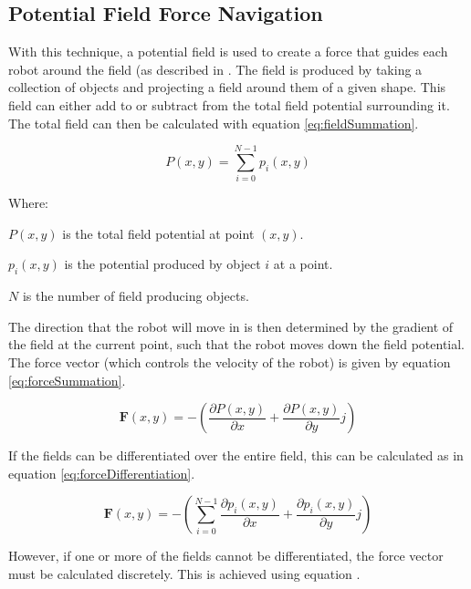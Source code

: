 \documentclass[10pt]{article}
\begin{document}
\subsection{Potential Field Force Navigation\label{sub:Potential-Field-Force}}

With this technique, a potential field is used to create a force that guides each robot around the field (as described in \cite{intelligentAlgorithmPathPlanning}. The field is produced by taking a collection of objects and projecting a field around them of a given shape. This field can either add to or subtract from the total field potential surrounding it. The total field can then be calculated with equation \ref{eq:fieldSummation}.

\begin{equation}
P(x,y)=\sum_{i=0}^{N-1}p_{i}\left(x,y\right)\label{eq:fieldSummation}
\end{equation}

Where:

$P\left(x,y\right)$ is the total field potential at point $\left(x,y\right)$.

$p_{i}\left(x,y\right)$ is the potential produced by object $i$ at a point.

$N$ is the number of field producing objects.

The direction that the robot will move in is then determined by the gradient of the field at the current point, such that the robot moves down the field potential. The force vector (which controls the velocity of the robot) is given by equation \ref{eq:forceSummation}.

\begin{equation}
\boldsymbol{F}(x,y)=-\left(\frac{{\partial P\left(x,y\right)}}{\partial x}+\frac{{\partial P\left(x,y\right)}}{\partial y}j\right)\label{eq:forceSummation}
\end{equation}

If the fields can be differentiated over the entire field, this can be calculated as in equation \ref{eq:forceDifferentiation}.

\begin{equation}
\boldsymbol{F}(x,y)=-\left(\sum_{i=0}^{N-1}\frac{\partial p_{i}\left(x,y\right)}{\partial x}+\frac{\partial p_{i}\left(x,y\right)}{\partial y}j\right)\label{eq:forceDifferentiation}
\end{equation}

However, if one or more of the fields cannot be differentiated, the force vector must be calculated discretely. This is achieved using equation .
\end{document}
